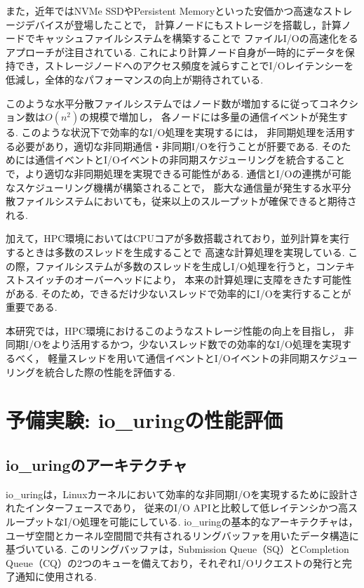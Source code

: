 \documentclass[a4paper,11pt]{jreport}
\begin{document}
また，近年ではNVMe SSDやPersistent Memoryといった安価かつ高速なストレージデバイスが登場したことで，
計算ノードにもストレージを搭載し，計算ノードでキャッシュファイルシステムを構築することで
ファイルI/Oの高速化をるアプローチが注目されている\cite{chfs}\cite{gekkofs}.
これにより計算ノード自身が一時的にデータを保持でき，ストレージノードへのアクセス頻度を減らすことでI/Oレイテンシーを低減し，全体的なパフォーマンスの向上が期待されている.

このような水平分散ファイルシステムではノード数が増加するに従ってコネクション数は$O(n^2)$の規模で増加し，
各ノードには多量の通信イベントが発生する. このような状況下で効率的なI/O処理を実現するには，
非同期処理を活用する必要があり，適切な非同期通信・非同期I/Oを行うことが肝要である.
そのためには通信イベントとI/Oイベントの非同期スケジューリングを統合することで，より適切な非同期処理を実現できる可能性がある.
通信とI/Oの連携が可能なスケジューリング機構が構築されることで，
膨大な通信量が発生する水平分散ファイルシステムにおいても，従来以上のスループットが確保できると期待される.

加えて，HPC環境においてはCPUコアが多数搭載されており，並列計算を実行するときは多数のスレッドを生成することで
高速な計算処理を実現している.
この際，ファイルシステムが多数のスレッドを生成しI/O処理を行うと，コンテキストスイッチのオーバーヘッドにより，
本来の計算処理に支障をきたす可能性がある.
そのため，できるだけ少ないスレッドで効率的にI/Oを実行することが重要である.

本研究では，HPC環境におけるこのようなストレージ性能の向上を目指し，
非同期I/Oをより活用するかつ，少ないスレッド数での効率的なI/O処理を実現するべく，
軽量スレッドを用いて通信イベントとI/Oイベントの非同期スケジューリングを統合した際の性能を評価する.

\chapter{予備実験: io\_uringの性能評価}
\section{io\_uringのアーキテクチャ}
io\_uringは，Linuxカーネルにおいて効率的な非同期I/Oを実現するために設計されたインターフェースであり，
従来のI/O APIと比較して低レイテンシかつ高スループットなI/O処理を可能にしている.
io\_uringの基本的なアーキテクチャは，ユーザ空間とカーネル空間間で共有されるリングバッファを用いたデータ構造に基づいている.
このリングバッファは，Submission Queue（SQ）とCompletion Queue（CQ）の2つのキューを備えており，それぞれI/Oリクエストの発行と完了通知に使用される.
\end{document}
